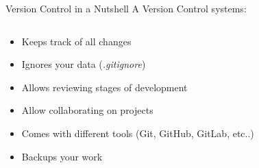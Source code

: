 \documentclass[xcolor=x11names,compress]{beamer}
\renewcommand{\(}{\begin{columns}}
\renewcommand{\)}{\end{columns}}
\newcommand{\<}[1]{\begin{column}{#1}}
\renewcommand{\>}{\end{column}}
\begin{document}
\begin{frame}{Version Control in a Nutshell }
A Version Control systems:
\begin{columns}[t]
\begin{column}{0.6\textwidth}
\begin{itemize}[<+->]
    \item Keeps track of all changes
    \item Ignores your data (\emph{.gitignore})
    \item Allows reviewing stages of development
    \item Allow collaborating on projects
    \item Comes with different tools (Git, GitHub, GitLab, etc..)
    \item Backups your work
  \end{itemize}
 \end{column}
  \begin{column}{0.4\textwidth}
    \begin{center}
    \begin{itemize}
    \end{itemize}
    \end{center}
  \end{column}
\end{columns}
\end{frame}
\end{document}
